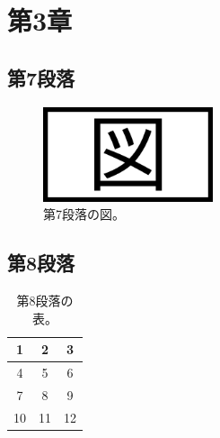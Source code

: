 \documentclass[a4paper, platex, dvipdfmx]{jsarticle}
\begin{document}
\section{第3章}
\subsection{第7段落}
\lipsum[7]

\begin{figure}[H]
  \centering
  \includegraphics[width=5cm]{sample.png}
  \caption{第7段落の図。}
\end{figure}

\subsection{第8段落}
\lipsum[8]

\begin{table}[H]
  \centering
  \caption{第8段落の表。}
  \begin{tabular}{ccc}
    \hline
    1 & 2 & 3 \\\hline
    4 & 5 & 6\\
    7 & 8 & 9 \\
    10 & 11 & 12 \\\hline
  \end{tabular}
\end{table}
\end{document}
